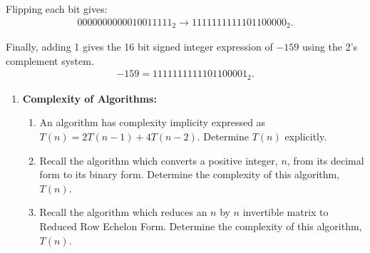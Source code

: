 \documentclass[12pt,twoside,openany]{memoir}
\begin{document}
\begin{solution}
    Flipping each bit gives:
        \begin{equation*}
        \begin{split}
            0000000000010011111_{2} \rightarrow 1111111111101100000_{2}.
        \end{split}
        \end{equation*}

    Finally, adding 1 gives the 16 bit signed integer expression of $-159$ using the 2's complement system.
        \begin{equation*}
        \begin{split}
            -159 = 1111111111101100001_{2}.
        \end{split}
        \end{equation*}
    


\end{solution}

\newpage
\vspace{25pt}
\begin{enumerate}[label = \arabic*.]
    \addtocounter{enumi}{1}
    \item \textbf{Complexity of Algorithms:}
        \begin{enumerate}[label = (\alph*)]
            \item An algorithm has complexity implicity expressed as $T(n) = 2T(n-1) + 4T(n-2)$. Determine $T(n)$ explicitly.
            \item Recall the algorithm which converts a positive integer, $n$, from its decimal form to its binary form. Determine the complexity of this algorithm, $T(n)$.
            \item Recall the algorithm which reduces an $n$ by $n$ invertible matrix to Reduced Row Echelon Form. Determine the complexity of this algorithm, $T(n)$.
        \end{enumerate}
\end{enumerate}
    
\end{document}
